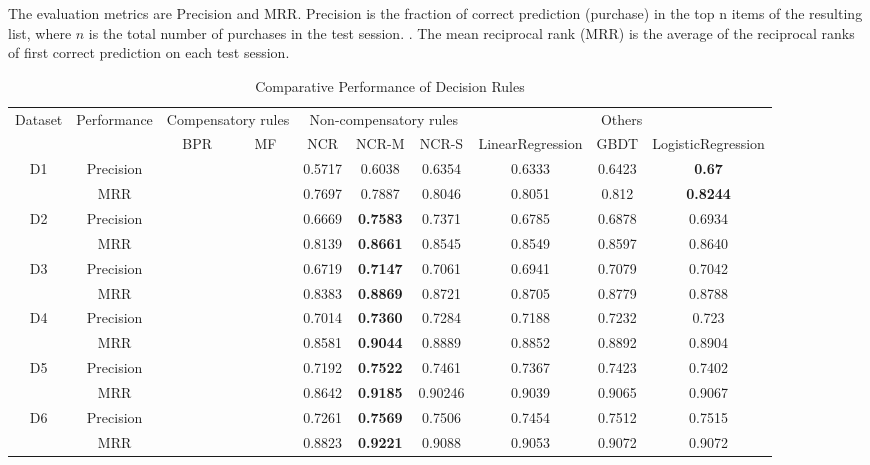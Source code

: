 \documentclass[sigconf]{acmart}
\begin{document}
  
The evaluation metrics are Precision and MRR. Precision is the fraction of correct prediction (purchase) in the top n items of the resulting list, where $n$ is the total number of purchases in the test session. . The mean reciprocal rank (MRR) is the average of the reciprocal ranks of first correct prediction on each test session.







\begin{table*}[htbp]
\caption{Comparative Performance of Decision Rules }
\label{tab:decision}
\begin{tabular}{|c|c|c|c|c|c|c|c|c|c|}
\hline
\multirow{2}{*}{Dataset} & \multirow{2}{*}{Performance}
& \multicolumn{2}{|c|}{Compensatory rules} & \multicolumn{3}{|c|}{Non-compensatory rules} & \multicolumn{3}{|c|}{Others} \\
\cline{3-10} & & BPR & MF & NCR & NCR-M & NCR-S & LinearRegression & GBDT & LogisticRegression \\\hline
\multirow{2}{*}{D1} &Precision	& & &	0.5717 & 0.6038 & 0.6354 &	0.6333 & 0.6423 &\bf{0.67}\\
\cline{2-10}	    &MRR		& & &0.7697 & 0.7887 & 0.8046 &0.8051 & 0.812	 &\bf{0.8244}\\\hline
\multirow{2}{*}{D2} &Precision  & & &0.6669 & \bf{0.7583} & 0.7371 &	0.6785 & 0.6878	& 0.6934\\
\cline{2-10}		 &MRR		& & &	0.8139 &\bf{0.8661} & 0.8545 & 0.8549 & 0.8597	& 0.8640\\\hline
\multirow{2}{*}{D3} &Precision & & & 0.6719 & \bf{0.7147} & 0.7061 &	0.6941 & 0.7079 & 0.7042\\
\cline{2-10} 		&MRR		& & & 0.8383 &\bf{0.8869} & 0.8721 & 0.8705 &0.8779 & 0.8788\\\hline
\multirow{2}{*}{D4} &Precision & & & 0.7014 & \bf{0.7360} & 0.7284 & 0.7188 & 0.7232 & 0.723\\
\cline{2-10} 		&MRR		& & & 0.8581& \bf{0.9044} & 0.8889 &	0.8852 & 0.8892& 0.8904\\\hline
\multirow{2}{*}{D5} &Precision	& &&	0.7192 &\bf{0.7522} &0.7461 & 0.7367 & 0.7423 &0.7402\\
\cline{2-10}		 &MRR		& && 0.8642 &\bf{0.9185} & 0.90246 & 0.9039 &	0.9065 & 0.9067\\\hline
\multirow{2}{*}{D6} &Precision	& && 0.7261 &\bf{0.7569} & 0.7506 & 0.7454 & 0.7512 & 0.7515\\
\cline{2-10}   		&MRR		& &&	0.8823& \bf{0.9221} &	0.9088 & 0.9053 & 0.9072 & 0.9072\\\hline
\end{tabular}
\end{table*}
\end{document}
